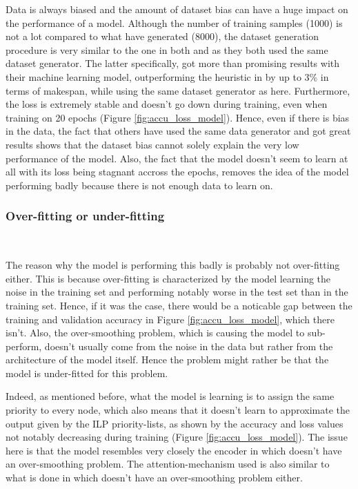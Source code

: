 Data is always biased and the amount of dataset bias\cite{torralba2011biasdataset}
can have a huge impact on the performance of a model.
Although the number of training samples (1000) is not a lot 
compared to what \citet{Lee2021GlobalDagSchedDRL} have generated (8000),
the dataset generation procedure is very similar to the one 
in both \citet{zhao2020DAGsched} and \citet{Lee2021GlobalDagSchedDRL}
as they both used the same dataset generator.
The latter specifically, got more than promising results with their machine learning model,
outperforming the heuristic in \citet{zhao2020DAGsched} by up to 3\% in terms of makespan,
 while using the same dataset generator as here.
Furthermore, the loss is extremely stable and doesn't go down
during training, even when training on 20 epochs (Figure \ref{fig:accu_loss_model}).
Hence, even if there is bias in the data, the fact that others have used
the same data generator and got great results shows that the
dataset bias cannot solely explain the very low performance of the model.
Also, the fact that the model doesn't seem to learn at all with 
its loss being stagnant accross the epochs, removes the 
idea of the model performing badly because there is not enough data to learn on.


\subsubsection{Over-fitting or under-fitting}
~

The reason why the model is performing this badly is probably
not over-fitting either.
This is because over-fitting is characterized
by the model learning the noise in the training set and performing
notably worse in the test set than in the training set\cite{jabbar2015overfitting_underfitting}.
Hence, if it was the case, there would be a noticable gap
between the training and validation accuracy in Figure \ref{fig:accu_loss_model},
which there isn't.
Also, the over-smoothing problem, which is causing the model to sub-perform,
 doesn't usually come from the noise
in the data but rather from the architecture of the model itself\cite{chen2020oversmoothing}.
Hence the problem might rather be that the model is under-fitted for this problem.

Indeed, as mentioned before, what the model is learning is 
to assign the same priority to every node, which also means
that it doesn't learn to approximate the output given by the ILP priority-lists,
as shown by the accuracy and loss values not notably decreasing during
training (Figure \ref{fig:accu_loss_model}).
The issue here is that the model resembles very closely the 
encoder in \citet{Lee2021GlobalDagSchedDRL} which doesn't 
have an over-smoothing problem.
The attention-mechanism used is also similar to what is done in \citet{Zhao2024GATDRLmodel}
which doesn't have an over-smoothing problem either.

